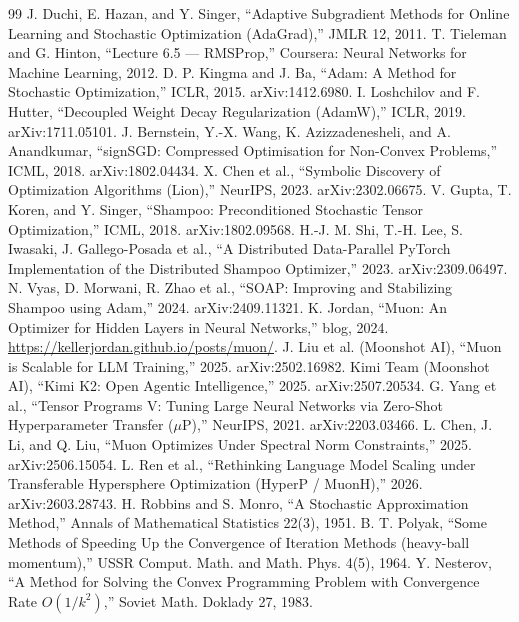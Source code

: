 \documentclass[10pt,conference]{IEEEtran}
\begin{document}
\begin{thebibliography}{99}
\footnotesize
{} J. Duchi, E. Hazan, and Y. Singer, ``Adaptive Subgradient Methods for Online Learning and Stochastic Optimization (AdaGrad),'' JMLR 12, 2011.
 T. Tieleman and G. Hinton, ``Lecture 6.5 --- RMSProp,'' Coursera: Neural Networks for Machine Learning, 2012.
 D. P. Kingma and J. Ba, ``Adam: A Method for Stochastic Optimization,'' ICLR, 2015. arXiv:1412.6980.
 I. Loshchilov and F. Hutter, ``Decoupled Weight Decay Regularization (AdamW),'' ICLR, 2019. arXiv:1711.05101.
 J. Bernstein, Y.-X. Wang, K. Azizzadenesheli, and A. Anandkumar, ``signSGD: Compressed Optimisation for Non-Convex Problems,'' ICML, 2018. arXiv:1802.04434.
 X. Chen et al., ``Symbolic Discovery of Optimization Algorithms (Lion),'' NeurIPS, 2023. arXiv:2302.06675.
 V. Gupta, T. Koren, and Y. Singer, ``Shampoo: Preconditioned Stochastic Tensor Optimization,'' ICML, 2018. arXiv:1802.09568.
 H.-J. M. Shi, T.-H. Lee, S. Iwasaki, J. Gallego-Posada et al., ``A Distributed Data-Parallel PyTorch Implementation of the Distributed Shampoo Optimizer,'' 2023. arXiv:2309.06497.
 N. Vyas, D. Morwani, R. Zhao et al., ``SOAP: Improving and Stabilizing Shampoo using Adam,'' 2024. arXiv:2409.11321.
 K. Jordan, ``Muon: An Optimizer for Hidden Layers in Neural Networks,'' blog, 2024. \url{https://kellerjordan.github.io/posts/muon/}.
 J. Liu et al. (Moonshot AI), ``Muon is Scalable for LLM Training,'' 2025. arXiv:2502.16982.
 Kimi Team (Moonshot AI), ``Kimi K2: Open Agentic Intelligence,'' 2025. arXiv:2507.20534.
 G. Yang et al., ``Tensor Programs V: Tuning Large Neural Networks via Zero-Shot Hyperparameter Transfer ($\mu$P),'' NeurIPS, 2021. arXiv:2203.03466.
 L. Chen, J. Li, and Q. Liu, ``Muon Optimizes Under Spectral Norm Constraints,'' 2025. arXiv:2506.15054.
 L. Ren et al., ``Rethinking Language Model Scaling under Transferable Hypersphere Optimization (HyperP / MuonH),'' 2026. arXiv:2603.28743.
 H. Robbins and S. Monro, ``A Stochastic Approximation Method,'' Annals of Mathematical Statistics 22(3), 1951.
 B. T. Polyak, ``Some Methods of Speeding Up the Convergence of Iteration Methods (heavy-ball momentum),'' USSR Comput. Math. and Math. Phys. 4(5), 1964.
 Y. Nesterov, ``A Method for Solving the Convex Programming Problem with Convergence Rate $O(1/k^2)$,'' Soviet Math. Doklady 27, 1983.

\end{thebibliography}
\end{document}
